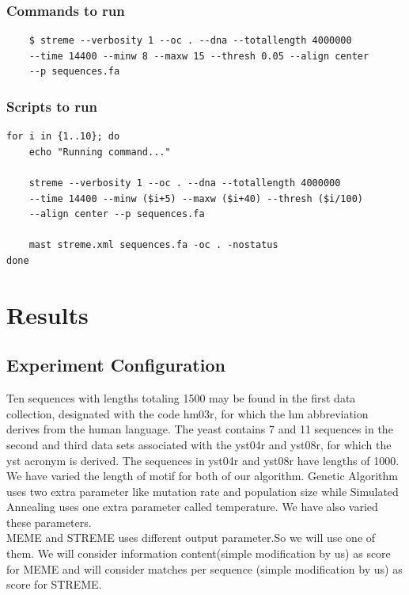 \documentclass{article}
\begin{document}
\begin{Large}
\subsubsection{Commands to run}
\begin{verbatim}
    $ streme --verbosity 1 --oc . --dna --totallength 4000000 
    --time 14400 --minw 8 --maxw 15 --thresh 0.05 --align center 
    --p sequences.fa
\end{verbatim}

\subsubsection{Scripts to run}
\begin{verbatim}
for i in {1..10}; do
    echo "Running command..."
    
    streme --verbosity 1 --oc . --dna --totallength 4000000 
    --time 14400 --minw ($i+5) --maxw ($i+40) --thresh ($i/100) 
    --align center --p sequences.fa

    mast streme.xml sequences.fa -oc . -nostatus
done
\end{verbatim}

\section{Results}
\subsection{Experiment Configuration}
Ten sequences with lengths totaling 1500 may be found in the first data collection, designated with the code hm03r, for which the hm abbreviation derives from the human language. The yeast contains 7 and 11 sequences in the second and third data sets associated with the yst04r and yst08r, for which the yst acronym is derived. The sequences in yst04r and yst08r have lengths of 1000. \\

We have varied the length of motif for both of our algorithm. Genetic Algorithm uses two extra parameter like mutation rate and population size while Simulated Annealing uses one extra parameter called temperature. We have also varied these parameters.\\

MEME and STREME uses different output parameter.So we will use one of them. We will consider information content(simple modification by us) as score for MEME and will consider matches per sequence (simple modification by us) as score for STREME.\\


\end{Large}
\end{document}
